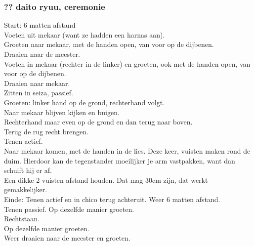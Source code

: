 \subsubsection{?? daito ryuu, ceremonie}
Start: 6 matten afstand\\
Voeten uit mekaar (want ze hadden een harnas aan).\\
Groeten naar mekaar, met de handen open, van voor op de dijbenen.\\
Draaien naar de meester.\\
Voeten in mekaar (rechter in de linker) en groeten, ook met de handen open, van voor op de dijbenen.\\
Draaien naar mekaar.\\
Zitten in seiza, passief.\\
Groeten: linker hand op de grond, rechterhand volgt.\\
Naar mekaar blijven kijken en buigen.\\
Rechterhand maar even op de grond en dan terug naar boven.\\
Terug de rug recht brengen.\\
Tenen actief.\\
Naar mekaar komen, met de handen in de lies. Deze keer, vuisten maken rond de duim. Hierdoor kan de tegenstander moeilijker je arm vastpakken, want dan schuift hij er af.\\
Een dikke 2 vuisten afstand houden. Dat mag 30cm zijn, dat werkt gemakkelijker.\\
Einde: Tenen actief en in chico terug achteruit. Weer 6 matten afstand.\\
Tenen passief. Op dezelfde manier groeten.\\
Rechtstaan.\\
Op dezelfde manier groeten.\\
Weer draaien naar de meester en groeten.

